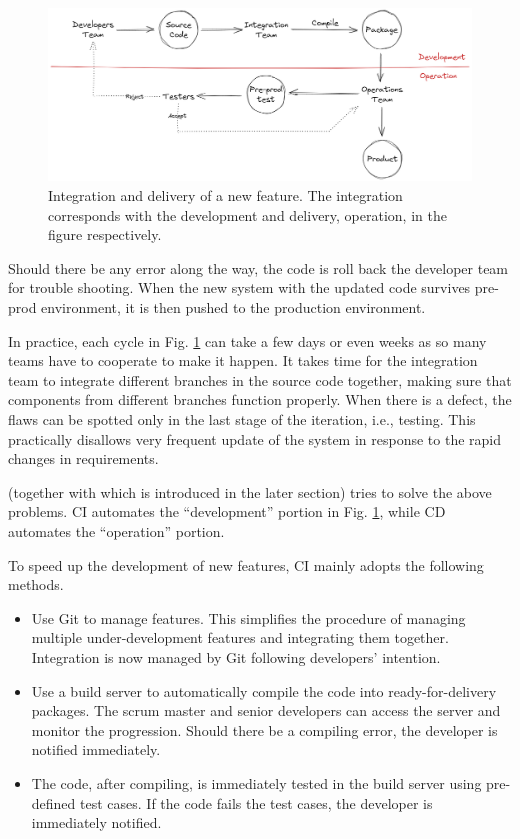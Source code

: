 \begin{figure}[!htb]
	\centering
	\includegraphics[width=350pt]{chapters/ap/figures/conventionalintegration.png}
	\caption{Integration and delivery of a new feature. The integration corresponds with the development and delivery, operation, in the figure respectively.} \label{ch:cicd:fig:conventionalintegration}
\end{figure}

Should there be any error along the way, the code is roll back the developer team for trouble shooting. When the new system with the updated code survives pre-prod environment, it is then pushed to the production environment.


In practice, each cycle in Fig. \ref{ch:cicd:fig:conventionalintegration} can take a few days or even weeks as so many teams have to cooperate to make it happen. It takes time for the integration team to integrate different branches in the source code together, making sure that components from different branches function properly. When there is a defect, the flaws can be spotted only in the last stage of the iteration, i.e., testing. This practically disallows very frequent update of the system in response to the rapid changes in requirements.

 (together with  which is introduced in the later section) tries to solve the above problems. CI automates the ``development'' portion in Fig. \ref{ch:cicd:fig:conventionalintegration}, while CD automates the ``operation'' portion.

To speed up the development of new features, CI mainly adopts the following methods.
\begin{itemize}
	\item Use Git to manage features. This simplifies the procedure of managing multiple under-development features and integrating them together. Integration is now managed by Git following developers' intention.
	\item Use a build server to automatically compile the code into ready-for-delivery packages. The scrum master and senior developers can access the server and monitor the progression. Should there be a compiling error, the developer is notified immediately.
	\item The code, after compiling, is immediately tested in the build server using pre-defined test cases. If the code fails the test cases, the developer is immediately notified.
\end{itemize}

